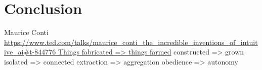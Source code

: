 %
\chapter{Conclusion}
\label{ch:conclusion}


Maurice Conti
\url{https://www.ted.com/talks/maurice_conti_the_incredible_inventions_of_intuitive_ai#t-844776
Things fabricated => things farmed}
constructed => grown
isolated => connected
extraction => aggregation
obedience => autonomy
